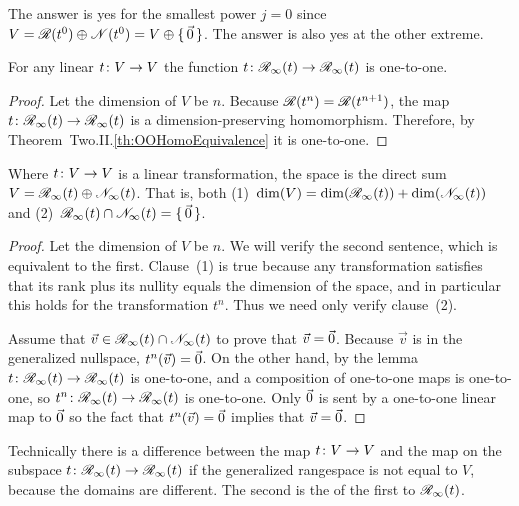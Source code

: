 The answer is yes for the smallest power $j=0$ since
\( V=\mathscr{R}(t^0)\oplus\mathscr{N}(t^0)=V\oplus\mbox{$\{\,\vec{0}\,\}$} \).
The answer is also yes at the other extreme.

\begin{lemma} \label{lem:RestONeToOne}
For any linear \( \mbox{$t\colon V\to V$} \) 
the function \( \mbox{$t\colon \mathscr{R}_\infty(t)\to \mathscr{R}_\infty(t)$} \)
is one-to-one.
\end{lemma}

\begin{proof}
Let the dimension of $V$ be $n$.
Because \( \mathscr{R}(t^n)=\mathscr{R}(t^{n+1}) \),
the map \( \mbox{$t\colon \mathscr{R}_\infty(t)\to \mathscr{R}_\infty(t)$} \) is
a dimension-preserving homomorphism. 
Therefore, by Theorem~Two.II.\ref{th:OOHomoEquivalence} it is one-to-one.  
\end{proof}

\begin{corollary} \label{GenRngNullDirSumToSp}
Where \( \mbox{$t\colon V\to V$} \) is a linear transformation, 
the space is the direct sum 
\( V=\mathscr{R}_\infty(t)\oplus\mathscr{N}_\infty(t) \).
That is, both (1)~\( \dim(V)=\dim(\mathscr{R}_\infty(t))+\dim(\mathscr{N}_\infty(t)) \) 
and (2)~\( \mathscr{R}_\infty(t)\cap\mathscr{N}_\infty(t)=\mbox{$\{\,\vec{0}\,\}$} \).
\end{corollary}

\begin{proof}
Let the dimension of $V$ be $n$.
We will verify the second sentence, which is equivalent to the first.
Clause~(1) is true because any transformation satisfies that
its rank plus its nullity
equals the dimension of the space,  
and in particular this holds for the transformation $t^n$.
Thus we need only verify clause~(2).

Assume that
\( \vec{v}\in\mathscr{R}_\infty(t)\cap\mathscr{N}_\infty(t) \)
to prove that $\vec{v}=\vec{0}$.
Because \( \vec{v} \) is in the generalized nullspace, \( t^n(\vec{v})=\vec{0} \).
On the other hand, by the lemma
\( \mbox{$t\colon \mathscr{R}_\infty(t)\to \mathscr{R}_\infty(t)$} \)
is one-to-one, and 
a composition of one-to-one maps is one-to-one, so
\( \mbox{$t^n\colon \mathscr{R}_\infty(t)\to \mathscr{R}_\infty(t)$} \) is one-to-one.
Only \( \vec{0} \) is sent by a one-to-one linear map to
\( \vec{0} \)  so the fact that \( t^n(\vec{v})=\vec{0} \) implies that
\( \vec{v}=\vec{0} \).
\end{proof}

\begin{remark}
Technically there is a difference between the map $\mbox{$t\colon V\to V$}$ and
the map on the subspace \( \mbox{$t\colon \mathscr{R}_\infty(t)\to \mathscr{R}_\infty(t)$} \)
if the generalized rangespace is not equal to $V$, because the domains are
different.
The second is the 
of the first to 
$\mathscr{R}_\infty(t)$. 
\end{remark}

